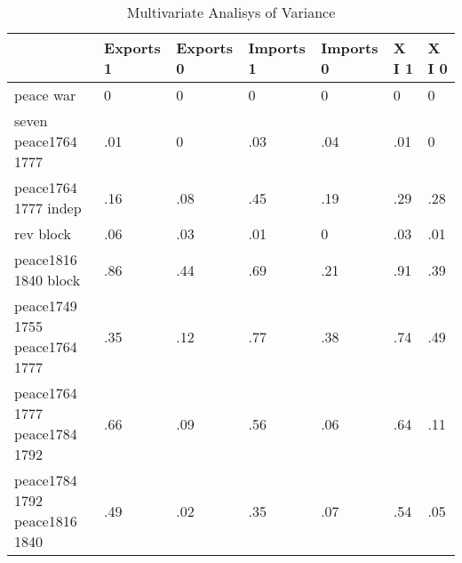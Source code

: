 \begin{table}[htbp]
\caption{\label{manova_test} Multivariate Analisys of Variance}\centering\medskip
\begin{tabular}{|l|l|l|l|l|l|l|}\hline  
 & Exports 1  & Exports 0  & Imports 1  & Imports 0  & X I 1  & X I 0  \\ \hline  
peace war & 0 & 0 & 0 & 0 & 0 & 0 \\ \hline 
seven peace1764 1777 & .01 & 0 & .03 & .04 & .01 & 0 \\ \hline 
peace1764 1777 indep & .16 & .08 & .45 & .19 & .29 & .28 \\ \hline 
rev block & .06 & .03 & .01 & 0 & .03 & .01 \\ \hline 
peace1816 1840 block & .86 & .44 & .69 & .21 & .91 & .39 \\ \hline 
peace1749 1755 peace1764 1777 & .35 & .12 & .77 & .38 & .74 & .49 \\ \hline 
peace1764 1777 peace1784 1792 & .66 & .09 & .56 & .06 & .64 & .11 \\ \hline 
peace1784 1792 peace1816 1840 & .49 & .02 & .35 & .07 & .54 & .05 \\ \hline 
  \end{tabular}
\end{table}
